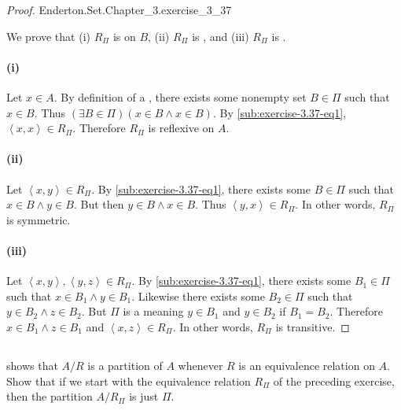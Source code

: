 \documentclass{report}
\newcommand{\pair}[1]{\left< #1 \right>}
\begin{document}
\begin{proof}

    {Enderton.Set.Chapter\_3.exercise\_3\_37}

  We prove that (i) $R_\Pi$ is  on $B$, (ii) $R_\Pi$ is
    , and (iii) $R_\Pi$ is .

  \paragraph{(i)}%

    Let $x \in A$.
    By definition of a , there exists some nonempty set
      $B \in \Pi$ such that $x \in B$.
    Thus $(\exists B \in \Pi)(x \in B \land x \in B)$.
    By \eqref{sub:exercise-3.37-eq1}, $\pair{x, x} \in R_\Pi$.
    Therefore $R_\Pi$ is reflexive on $A$.

  \paragraph{(ii)}%

    Let $\pair{x, y} \in R_\Pi$.
    By \eqref{sub:exercise-3.37-eq1}, there exists some $B \in \Pi$ such that
      $x \in B \land y \in B$.
    But then $y \in B \land x \in B$.
    Thus $\pair{y, x} \in R_\Pi$.
    In other words, $R_\Pi$ is symmetric.

  \paragraph{(iii)}%

    Let $\pair{x, y}, \pair{y, z} \in R_\Pi$.
    By \eqref{sub:exercise-3.37-eq1}, there exists some $B_1 \in \Pi$ such that
      $x \in B_1 \land y \in B_1$.
    Likewise there exists some $B_2 \in \Pi$ such that
      $y \in B_2 \land z \in B_2$.
    But $\Pi$ is a  meaning $y \in B_1$ and $y \in B_2$
      if $B_1 = B_2$.
    Therefore $x \in B_1 \land z \in B_1$ and $\pair{x, z} \in R_\Pi$.
    In other words, $R_\Pi$ is transitive.

\end{proof}

\subsection{}%

 shows that $A / R$ is a partition of $A$ whenever $R$
  is an equivalence relation on $A$.
Show that if we start with the equivalence relation $R_\Pi$ of the preceding
  exercise, then the partition $A / R_\Pi$ is just $\Pi$.
\end{document}
